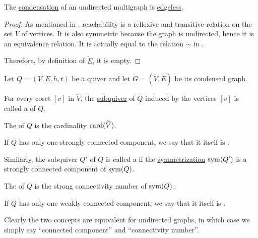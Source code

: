 \begin{proposition}\label{thm:undirected_graph_condensation}
  The \hyperref[def:quiver_condensation]{condensation} of an undirected multigraph is \hyperref[def:theory_of_graphs/trivial]{edgeless}.
\end{proposition}
\begin{proof}
  As mentioned in , reachability is a reflexive and transitive relation on the set \( V \) of vertices. It is also symmetric because the graph is undirected, hence it is an equivalence relation. It is actually equal to the relation \( {\sim} \) in .

  Therefore, by definition of \( \widetilde{E} \), it is empty.
\end{proof}

\begin{definition}\label{def:quiver_connectedness}
  Let \( Q = (V, E, h, t) \) be a quiver and let \( \widetilde{G} = (\widetilde{V}, \widetilde{E}) \) be its condensed graph.

  \begin{thmenum}
     For every coset \( [v] \) in \( \widetilde{V} \), the \hyperref[def:theory_of_graphs/submodels]{subquiver} of \( Q \) induced by the vertices \( [v] \) is called a  of \( Q \).

    The  of \( Q \) is the cardinality \( \operatorname{card}(\widetilde{V}) \).

    If \( Q \) has only one strongly connected component, we say that it itself is .

     Similarly, the subquiver \( Q' \) of \( Q \) is called a  if the \hyperref[rem:undirected_graphs_as_directed]{symmetrization} \( \operatorname{sym}(Q') \) is a strongly connected component of \( \operatorname{sym}(Q) \).

    The  of \( Q \) is the strong connectivity number of \( \operatorname{sym}(Q) \).

    If \( Q \) has only one weakly connected component, we say that it itself is .
  \end{thmenum}

  Clearly the two concepts are equivalent for undirected graphs, in which case we simply say \enquote{connected component} and \enquote{connectivity number}.
\end{definition}

